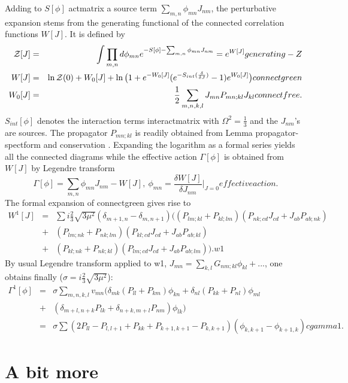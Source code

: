 \documentclass[10pt]{book}
\let\int\int
\theoremstyle{break}
\begin{document}
Adding to $S[\phi]$ {actmatrix} a source term $\sum_{m,n}\phi_{mn}J_{nm}$, the perturbative expansion stems from the generating functional of the connected correlation functions $W[J]$. It is defined by 
\begin{eqnarray}
{\cal{Z}}[J]&=&\int\prod_{m,n}d\phi_{mn}e^{-S[\phi]-\sum_{m,n}\phi_{mn}J_{nm}}=e^{W[J]}{generating-Z}\\
W[J]&=&\ln{\cal{Z}}(0)+W_0[J]+\ln\big(1+e^{-W_0[J]} ( e^{ -S_{int}(\frac{\delta}{\delta J})}   -1)e^{W_0[J]} \big){connectgreen}\\
W_0[J]&=&\frac{1}{2}\sum_{m,n,k,l}J_{mn}P_{mn;kl}J_{kl}{connectfree}.
\end{eqnarray}
$S_{int}[\phi]$ denotes the interaction terms interactmatrix with $\Omega^2=\frac{1}{3}$ and the $J_{nm}$'s are sources. The propagator  $P_{mn;kl}$ is readily obtained from Lemma {propagator-spectform} and {conservation} . Expanding the logarithm as a formal series yields all the connected diagrams while the effective action $\Gamma[\phi]$ is  obtained from $W[J]$ by Legendre transform
\begin{equation}
\Gamma[\phi]=\sum_{m,n}\phi_{mn}J_{nm}-W[J],\ \phi_{mn}=\frac{\delta W[J]}{\delta J_{nm}}\vert_{J=0}{effectiveaction}.
\end{equation}
The formal expansion of {connectgreen} gives rise to
\begin{eqnarray}
W^{1}[J]&=& \sum i\frac{2}{3}{\sqrt{3\mu^2}}(\delta_{m+1,n}-\delta_{m,n+1})\big((P_{lm;kl}+P_{kl;lm})(P_{nk;cd}J_{cd}+J_{ab}P_{ab;nk})\nonumber\\
&+&(P_{lm;nk}+P_{nk;lm})(P_{kl;cd}J_{cd}+J_{ab}P_{ab;kl})\nonumber\\
&+&(P_{kl;nk}+P_{nk;kl})(P_{lm;cd}J_{cd}+J_{ab}P_{ab;lm}) \big).{w1}
\end{eqnarray}
By usual Legendre transform applied to {w1}, $J_{mn}=\sum_{k,l}G_{nm;kl}\phi_{kl}+...$, one obtains finally ($\sigma=i\frac{2}{3}{\sqrt{3\mu^2}}$):
\begin{eqnarray}
\Gamma^1[\phi]&=&\sigma\sum_{m,n,k,l} v_{mn}\big(\delta_{mk}(P_{ll}+P_{km})\phi_{kn} +\delta_{nl}(P_{kk}+P_{nl})\phi_{ml}\nonumber\\
&+&(\delta_{m+l,n+k}P_{lk}+\delta_{n+k,m+l}P_{nm})\phi_{lk} \big)\nonumber\\
&=&\sigma\sum(2P_{ll}-P_{l,l+1}+P_{kk}+P_{k+1,k+1}-P_{k,k+1})(\phi_{k,k+1}-\phi_{k+1,k}){cgamma1}.
\end{eqnarray}



\section{A bit more}
\end{document}
